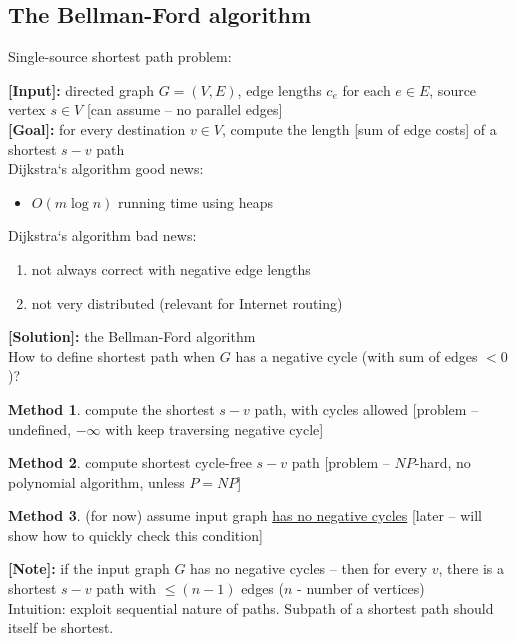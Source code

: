 \documentclass[a4paper,12pt]{article}
\theoremstyle{plain}
\theoremstyle{definition}
\newtheorem{method}{Method}[subsection]
\theoremstyle{remark}
\begin{document}
\subsection{The Bellman-Ford algorithm}
Single-source shortest path problem:

\textbf{[Input]:} directed graph $G = (V, E)$, edge lengths $c_e$ for each $e \in E$, source vertex $s \in V$ [can assume -- no parallel edges]
\\

\textbf{[Goal]:} for every destination $v \in V$, compute the length [sum of edge costs] of a shortest $s-v$ path
\\

Dijkstra`s algorithm good news:
\begin{itemize}
	\item $O(m \log n)$ running time using heaps
\end{itemize}

Dijkstra`s algorithm bad news:
\begin{enumerate}
	\item not always correct with negative edge lengths
	\item not very distributed (relevant for Internet routing)
\end{enumerate}

\textbf{[Solution]:} the Bellman-Ford algorithm
\\

How to define shortest path when $G$ has a negative cycle (with sum of edges $< 0$)?
\begin{method}compute the shortest $s-v$ path, with cycles allowed [problem -- undefined, $-\infty$ with keep traversing negative cycle]\end{method}
\begin{method}compute shortest cycle-free $s-v$ path [problem -- $NP$-hard, no polynomial algorithm, unless $P = NP$]\end{method}
\begin{method}(for now) assume input graph \underline{has no negative cycles} [later -- will show how to quickly check this condition]\end{method}

\textbf{[Note]:} if the input graph $G$ has no negative cycles -- then for every $v$, there is a shortest $s-v$ path with $\leq (n-1)$ edges ($n$ - number of vertices)
\\

Intuition: exploit sequential nature of paths. Subpath of a shortest path should itself be shortest.
\\
\end{document}

